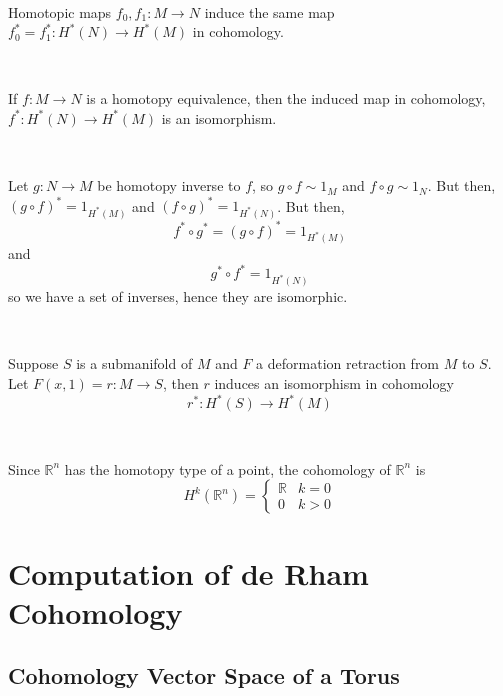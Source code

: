 \documentclass{article}
\begin{document}
\begin{theorem}
\

Homotopic maps $f_0, f_1: M \to N$ induce the same map $f_0^* = f_1^*: H^*(N)\to H^*(M)$ in cohomology.
\end{theorem}

\begin{corollary}
\

If $f: M \to N$ is a homotopy equivalence, then the induced map in cohomology, $f^*: H^*(N) \to H^*(M)$ is an isomorphism.
\end{corollary}

\begin{customproof}
\

Let $g: N \to M$ be homotopy inverse to $f$, so $g \circ f \sim 1_M$ and $f \circ g \sim 1_N$. But then, $(g \circ f)^* = 1_{H^*(M)}$ and $(f \circ g)^* = 1_{H^*(N)}$. But then, $$f^* \circ g^* = (g \circ f)^* = 1_{H^*(M)}$$and $$g^* \circ f^* = 1_{H^*(N)}$$so we have a set of inverses, hence they are isomorphic.
\end{customproof}

\begin{corollary}
\

Suppose $S$ is a submanifold of $M$ and $F$ a deformation retraction from $M$ to $S$. Let $F(x,1)=r: M \to S$, then $r$ induces an isomorphism in cohomology $$r^*: H^*(S) \to H^*(M)$$
\end{corollary}

\begin{corollary}
\

Since $\mathbb{R}^n$ has the homotopy type of a point, the cohomology of $\mathbb{R}^n$ is $$H^k(\mathbb{R}^n) = \begin{cases}
  \mathbb{R} & k=0\\
  0 & k > 0
\end{cases}$$
\end{corollary}

\section{Computation of de Rham Cohomology}

\subsection{Cohomology Vector Space of a Torus}
\
\end{document}
